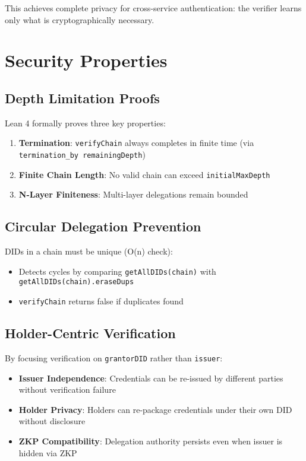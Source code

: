 This achieves complete privacy for cross-service authentication: the verifier learns only what is cryptographically necessary.

\section{Security Properties}

\subsection{Depth Limitation Proofs}

Lean 4 formally proves three key properties:

\begin{enumerate}
  \item \textbf{Termination}: \texttt{verifyChain} always completes in finite time (via \texttt{termination\_by remainingDepth})
  \item \textbf{Finite Chain Length}: No valid chain can exceed \texttt{initialMaxDepth}
  \item \textbf{N-Layer Finiteness}: Multi-layer delegations remain bounded
\end{enumerate}

\subsection{Circular Delegation Prevention}

DIDs in a chain must be unique (O(n) check):

\begin{itemize}
  \item Detects cycles by comparing \texttt{getAllDIDs(chain)} with \texttt{getAllDIDs(chain).eraseDups}
  \item \texttt{verifyChain} returns false if duplicates found
\end{itemize}

\subsection{Holder-Centric Verification}

By focusing verification on \texttt{grantorDID} rather than \texttt{issuer}:

\begin{itemize}
  \item \textbf{Issuer Independence}: Credentials can be re-issued by different parties without verification failure
  \item \textbf{Holder Privacy}: Holders can re-package credentials under their own DID without disclosure
  \item \textbf{ZKP Compatibility}: Delegation authority persists even when issuer is hidden via ZKP
\end{itemize}

